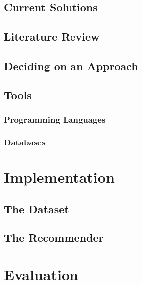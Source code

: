 \documentclass[a4paper,12pt,twoside,notitlepage,draft]{report}
\begin{document}
\section{Current Solutions}

\section{Literature Review}

\section{Deciding on an Approach}

\section{Tools}

 \subsection{Programming Languages}

 \subsection{Databases}

\chapter{Implementation}

\section{The Dataset}

\section{The Recommender}

\chapter{Evaluation}
\end{document}
